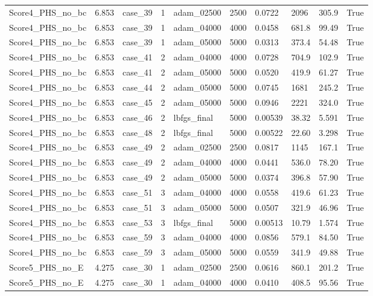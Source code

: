 \begin{longtable}{llllllllll}
Score4\_PHS\_no\_bc & 6.853 & case\_39 & 1 & adam\_02500 & 2500 & 0.0722 & 2096 & 305.9 & True \\
Score4\_PHS\_no\_bc & 6.853 & case\_39 & 1 & adam\_04000 & 4000 & 0.0458 & 681.8 & 99.49 & True \\
Score4\_PHS\_no\_bc & 6.853 & case\_39 & 1 & adam\_05000 & 5000 & 0.0313 & 373.4 & 54.48 & True \\
Score4\_PHS\_no\_bc & 6.853 & case\_41 & 2 & adam\_04000 & 4000 & 0.0728 & 704.9 & 102.9 & True \\
Score4\_PHS\_no\_bc & 6.853 & case\_41 & 2 & adam\_05000 & 5000 & 0.0520 & 419.9 & 61.27 & True \\
Score4\_PHS\_no\_bc & 6.853 & case\_44 & 2 & adam\_05000 & 5000 & 0.0745 & 1681 & 245.2 & True \\
Score4\_PHS\_no\_bc & 6.853 & case\_45 & 2 & adam\_05000 & 5000 & 0.0946 & 2221 & 324.0 & True \\
Score4\_PHS\_no\_bc & 6.853 & case\_46 & 2 & lbfgs\_final & 5000 & 0.00539 & 38.32 & 5.591 & True \\
Score4\_PHS\_no\_bc & 6.853 & case\_48 & 2 & lbfgs\_final & 5000 & 0.00522 & 22.60 & 3.298 & True \\
Score4\_PHS\_no\_bc & 6.853 & case\_49 & 2 & adam\_02500 & 2500 & 0.0817 & 1145 & 167.1 & True \\
Score4\_PHS\_no\_bc & 6.853 & case\_49 & 2 & adam\_04000 & 4000 & 0.0441 & 536.0 & 78.20 & True \\
Score4\_PHS\_no\_bc & 6.853 & case\_49 & 2 & adam\_05000 & 5000 & 0.0374 & 396.8 & 57.90 & True \\
Score4\_PHS\_no\_bc & 6.853 & case\_51 & 3 & adam\_04000 & 4000 & 0.0558 & 419.6 & 61.23 & True \\
Score4\_PHS\_no\_bc & 6.853 & case\_51 & 3 & adam\_05000 & 5000 & 0.0507 & 321.9 & 46.96 & True \\
Score4\_PHS\_no\_bc & 6.853 & case\_53 & 3 & lbfgs\_final & 5000 & 0.00513 & 10.79 & 1.574 & True \\
Score4\_PHS\_no\_bc & 6.853 & case\_59 & 3 & adam\_04000 & 4000 & 0.0856 & 579.1 & 84.50 & True \\
Score4\_PHS\_no\_bc & 6.853 & case\_59 & 3 & adam\_05000 & 5000 & 0.0559 & 341.9 & 49.88 & True \\
Score5\_PHS\_no\_E & 4.275 & case\_30 & 1 & adam\_02500 & 2500 & 0.0616 & 860.1 & 201.2 & True \\
Score5\_PHS\_no\_E & 4.275 & case\_30 & 1 & adam\_04000 & 4000 & 0.0410 & 408.5 & 95.56 & True \\

\end{longtable}
